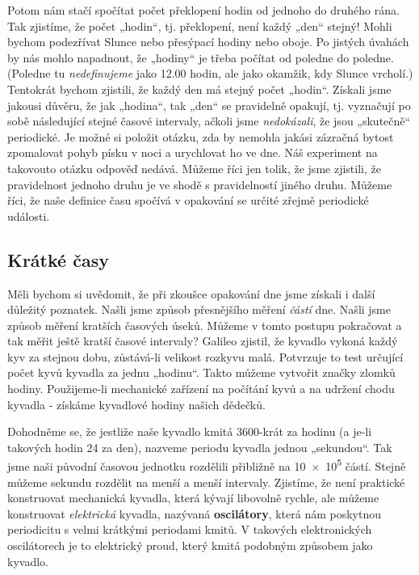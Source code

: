     Potom nám stačí spočítat počet překlopení hodin od jednoho do druhého rána. Tak zjistíme, že 
    počet „hodin“, tj. překlopení, není každý „den“ stejný! Mohli bychom podezřívat Slunce nebo 
    přesýpací hodiny nebo oboje. Po jistých úvahách by nás mohlo napadnout, že „hodiny“ je třeba 
    počítat od poledne do poledne. (Poledne tu \emph{nedefinujeme} jako 12.00 hodin, ale jako 
    okamžik, kdy Slunce vrcholí.) Tentokrát bychom zjistili, že každý den má stejný počet „hodin“. 
    Získali jsme jakousi důvěru, že jak „hodina“, tak „den“ se pravidelně opakují, tj. vyznačují po 
    sobě následující stejné časové intervaly, ačkoli jsme \emph{nedokázali}, že jsou „skutečně“ 
    periodické. Je možné si položit otázku, zda by nemohla jakási zázračná bytost zpomalovat pohyb 
    písku v noci a urychlovat ho ve dne. Náš experiment na takovouto otázku odpověď nedává. Můžeme 
    říci jen tolik, že jsme zjistili, že pravidelnost jednoho druhu je ve shodě s pravidelností 
    jiného druhu. Můžeme říci, že naše definice času spočívá v opakování se určité zřejmě  
    periodické události.
    
    \subsection{Krátké časy}
      Měli bychom si uvědomit, že při zkoušce opakování dne jsme získali i další důležitý poznatek.
      Našli jsme způsob přesnějšího měření \emph{částí} dne. Našli jsme způsob měření kratších
      časových úseků. Můžeme v tomto postupu pokračovat a tak měřit ještě kratší časové intervaly?
      Galileo zjistil, že kyvadlo vykoná každý kyv za stejnou dobu, zůstává-li velikost rozkyvu
      malá. Potvrzuje to test určující počet kyvů kyvadla za jednu „hodinu“. Takto můžeme vytvořit
      značky zlomků hodiny. Použijeme-li mechanické zařízení na počítání kyvů a na udržení chodu
      kyvadla - získáme kyvadlové hodiny našich dědečků.
      
      Dohodněme se, že jestliže naše kyvadlo kmitá \num{3600}-krát za hodinu (a je-li takových hodin
      \num{24} za den), nazveme periodu kyvadla jednou „sekundou“. Tak jsme naši původní časovou
      jednotku rozdělili přibližně na \num{10e5} částí. Stejně můžeme sekundu rozdělit na menší a
      menší intervaly. Zjistíme, že není praktické konstruovat mechanická kyvadla, která kývají
      libovolně rychle, ale můžeme konstruovat \emph{elektrická} kyvadla, nazývaná
      \textbf{oscilátory}, která nám poskytnou periodicitu s velmi krátkými periodami kmitů. V
      takových elektronických oscilátorech je to elektrický proud, který kmitá podobným způsobem
      jako kyvadlo.
      
